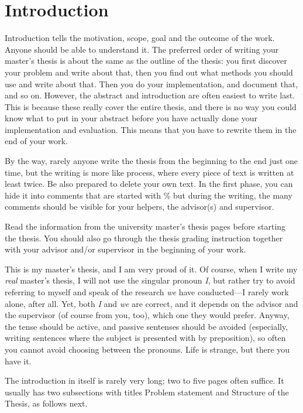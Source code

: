 \chapter{Introduction}
\label{chapter:intro}


Introduction tells the motivation, scope, goal and the outcome of the
work. Anyone should be able to understand it. The preferred order of
writing your master's thesis is about the same as the outline of the
thesis: you first discover your problem and write about that, then you
find out what methods you should use and write about that.  Then you
do your implementation, and document that, and so on.  However, the
abstract and introduction are often easiest to write last.  This is
because these really cover the entire thesis, and there is no way you
could know what to put in your abstract before you have actually done
your implementation and evaluation. This means that you have to
rewrite them in the end of your work.

By the way, rarely anyone write the thesis from the beginning to the
end just one time, but the writing is more like process, where every
piece of text is written at least twice. Be also prepared to delete
your own text. In the first phase, you can hide it into comments that
are started with \% but during the writing, the many comments should
be visible for your helpers, the advisor(s) and supervisor.

Read the information from the university master's thesis
pages  before starting the thesis.  You
should also go through the thesis grading
instruction  together with your advisor and/or
supervisor in the beginning of your work.

This is my master's thesis, and I am very proud of it.  Of course,
when I write my \emph{real} master's thesis, I will not use the
singular pronoun \emph{I}, but rather try to avoid referring to myself
and speak of the research \emph{we} have conducted---I rarely work
alone, after all.  Yet, both \emph{I} and \emph{we} are correct, and
it depends on the advisor and the supervisor (of course from you,
too), which one they would prefer. Anyway, the tense should be active,
and passive sentenses should be avoided (especially, writing sentences
where the subject is presented with by preposition), so often you
cannot avoid choosing between the pronouns. Life is strange, but there
you have it.

The introduction in itself is rarely very long; two to five pages
often suffice. It usually has two subsections with titles Problem
statement and Structure of the Thesis, as follows next.


